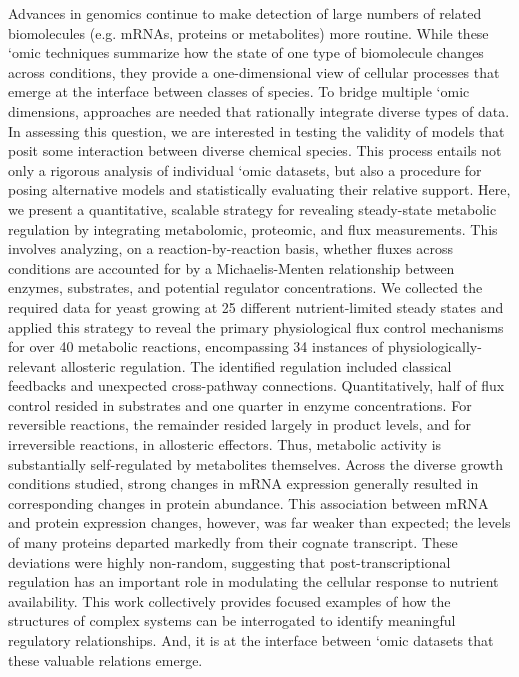 Advances in genomics continue to make detection of large numbers of related biomolecules (e.g. mRNAs, proteins or metabolites) more routine. While these `omic techniques summarize how the state of one type of biomolecule changes across conditions, they provide a one-dimensional view of cellular processes that emerge at the interface between classes of species. To bridge multiple `omic dimensions, approaches are needed that rationally integrate diverse types of data. In assessing this question, we are interested in testing the validity of models that posit some interaction between diverse chemical species. This process entails not only a rigorous analysis of individual `omic datasets, but also a procedure for posing alternative models and statistically evaluating their relative support. Here, we present a quantitative, scalable strategy for revealing steady-state metabolic regulation by integrating metabolomic, proteomic, and flux measurements. This involves analyzing, on a reaction-by-reaction basis, whether fluxes across conditions are accounted for by a Michaelis-Menten relationship between enzymes, substrates, and potential regulator concentrations. We collected the required data for yeast growing at 25 different nutrient-limited steady states and applied this strategy to reveal the primary physiological flux control mechanisms for over 40 metabolic reactions, encompassing 34 instances of physiologically-relevant allosteric regulation. The identified regulation included classical feedbacks and unexpected cross-pathway connections. Quantitatively, half of flux control resided in substrates and one quarter in enzyme concentrations. For reversible reactions, the remainder resided largely in product levels, and for irreversible reactions, in allosteric effectors. Thus, metabolic activity is substantially self-regulated by metabolites themselves. Across the diverse growth conditions studied, strong changes in mRNA expression generally resulted in corresponding changes in protein abundance. This association between mRNA and protein expression changes, however, was far weaker than expected; the levels of many proteins departed markedly from their cognate transcript. These deviations were highly non-random, suggesting that post-transcriptional regulation has an important role in modulating the cellular response to nutrient availability. This work collectively provides focused examples of how the structures of complex systems can be interrogated to identify meaningful regulatory relationships.  And, it is at the interface between `omic datasets that these valuable relations emerge.
